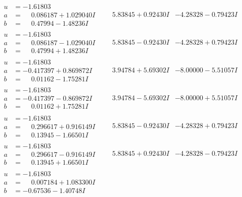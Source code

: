 \documentclass[1p]{elsarticle_modified}
\theoremstyle{definition}
\begin{document}
$$\begin{array}{c|c|c}
\begin{aligned}
u &= -1.61803\phantom{ +0.000000I} \\
a &= \phantom{-}0.086187 + 1.029040 I \\
b &= \phantom{-}0.47994 - 1.48236 I\end{aligned}
 & \phantom{-}5.83845 + 0.92430 I & -4.28328 - 0.79423 I \\ \hline\begin{aligned}
u &= -1.61803\phantom{ +0.000000I} \\
a &= \phantom{-}0.086187 - 1.029040 I \\
b &= \phantom{-}0.47994 + 1.48236 I\end{aligned}
 & \phantom{-}5.83845 - 0.92430 I & -4.28328 + 0.79423 I \\ \hline\begin{aligned}
u &= -1.61803\phantom{ +0.000000I} \\
a &= -0.417397 + 0.869872 I \\
b &= \phantom{-}0.01162 - 1.75281 I\end{aligned}
 & \phantom{-}3.94784 + 5.69302 I & -8.00000 - 5.51057 I \\ \hline\begin{aligned}
u &= -1.61803\phantom{ +0.000000I} \\
a &= -0.417397 - 0.869872 I \\
b &= \phantom{-}0.01162 + 1.75281 I\end{aligned}
 & \phantom{-}3.94784 - 5.69302 I & -8.00000 + 5.51057 I \\ \hline\begin{aligned}
u &= -1.61803\phantom{ +0.000000I} \\
a &= \phantom{-}0.296617 + 0.916149 I \\
b &= \phantom{-}0.13945 - 1.66501 I\end{aligned}
 & \phantom{-}5.83845 - 0.92430 I & -4.28328 + 0.79423 I \\ \hline\begin{aligned}
u &= -1.61803\phantom{ +0.000000I} \\
a &= \phantom{-}0.296617 - 0.916149 I \\
b &= \phantom{-}0.13945 + 1.66501 I\end{aligned}
 & \phantom{-}5.83845 + 0.92430 I & -4.28328 - 0.79423 I \\ \hline\begin{aligned}
u &= -1.61803\phantom{ +0.000000I} \\
a &= \phantom{-}0.007184 + 1.083300 I \\
b &= -0.67536 - 1.40748 I\end{aligned}

\end{array}$$
\end{document}
